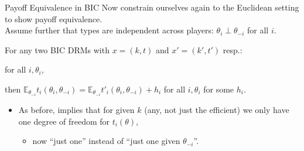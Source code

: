 \documentclass[english,10pt
,aspectratio=169
]{beamer}
\begin{document}


\begin{frame}{Payoff Equivalence in BIC}
	Now constrain ourselves again to the \alert{Euclidean} setting to show payoff equivalence.
	\\
	Assume further that types are independent across players: $\theta_i \perp \theta_{-i}$ for all $i$.
	\begin{theorem}
		For any two BIC DRMs with $x = (k,t)$ and $x' = (k',t')$ resp.:
		
		 for all $i,\theta_i$,
		
		\alert{then $\mathbb{E}_{\theta_{-i}} t_i(\theta_i, \theta_{-i}) = \mathbb{E}_{\theta_{-i}} t'_i(\theta_i, \theta_{-i}) + h_i$} for all $i,\theta_i$ for some $h_i$.
	\end{theorem}
	\begin{itemize}
		\item As before, implies that for given $k$ (any, not just the efficient) we only have one degree of freedom for $t_i(\theta)$,
		\begin{itemize}
			\item now ``just one'' instead of ``just one given $\theta_{-i}$''.
		\end{itemize}
	\end{itemize}
\end{frame}
\end{document}
